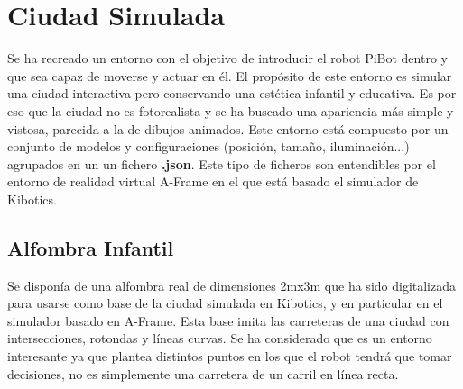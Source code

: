 \documentclass{report}
\begin{document}
\newpage
\section{Ciudad Simulada}

Se ha recreado un entorno con el objetivo de introducir el robot PiBot dentro y que sea capaz de  moverse y actuar en él. El propósito de este entorno es simular una ciudad interactiva pero conservando una estética infantil y educativa. Es por eso que la ciudad no es fotorealista y se ha buscado una apariencia más simple y vistosa, parecida a la de dibujos animados. Este entorno está compuesto por un conjunto de modelos y configuraciones (posición, tamaño, iluminación...) agrupados en un un fichero \textbf{.json}. Este tipo de ficheros son entendibles por el entorno de realidad virtual A-Frame en el que está basado el simulador de Kibotics.

\subsection{Alfombra Infantil}
Se disponía de una alfombra real de dimensiones 2mx3m que ha sido digitalizada para usarse como base de la ciudad simulada en Kibotics, y en particular en el simulador basado en A-Frame. Esta base imita las carreteras de una ciudad con intersecciones, rotondas y líneas curvas. Se ha considerado que es un entorno interesante ya que plantea distintos puntos en los que el robot tendrá que tomar decisiones, no es simplemente una carretera de un carril en línea recta.
\end{document}
